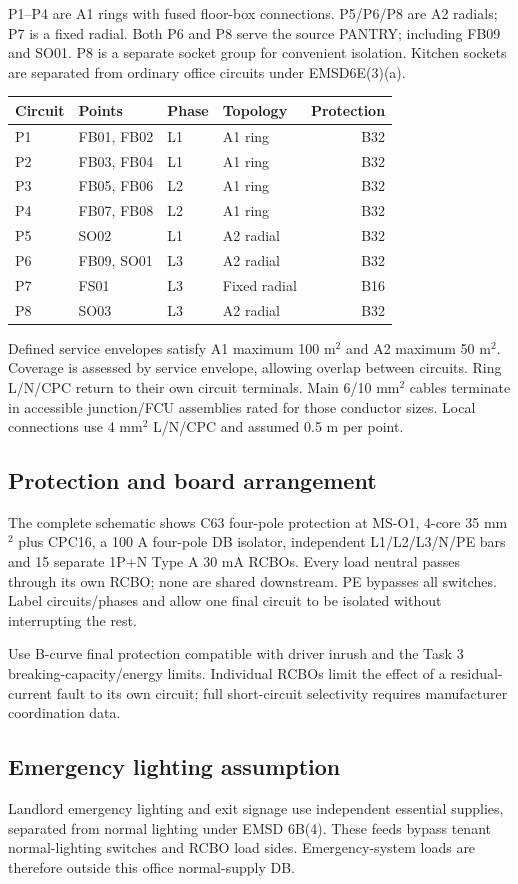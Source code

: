 P1--P4 are A1 rings with fused floor-box connections. P5/P6/P8 are A2 radials;  P7 is a fixed radial. Both P6 and P8 serve the source PANTRY;  including FB09 and SO01. P8 is a separate socket group for convenient isolation. Kitchen sockets are separated from ordinary office circuits under EMSD6E(3)(a).
\begin{center}\begin{tabular}{llllr}\toprule
Circuit & Points & Phase & Topology & Protection\\\midrule

P1 & FB01, FB02 & L1 & A1 ring & B32 \\
P2 & FB03, FB04 & L1 & A1 ring & B32 \\
P3 & FB05, FB06 & L2 & A1 ring & B32 \\
P4 & FB07, FB08 & L2 & A1 ring & B32 \\
P5 & SO02 & L1 & A2 radial & B32 \\
P6 & FB09, SO01 & L3 & A2 radial & B32 \\
P7 & FS01 & L3 & Fixed radial & B16 \\
P8 & SO03 & L3 & A2 radial & B32 \\

\bottomrule\end{tabular}\end{center}
Defined service envelopes satisfy A1 maximum 100 m$^2$ and A2 maximum 50 m$^2$. Coverage is assessed by service envelope, allowing overlap between circuits. Ring L/N/CPC return to their own circuit terminals. Main 6/10 mm$^2$ cables terminate in accessible junction/FCU assemblies rated for those conductor sizes. Local connections use 4 mm$^2$ L/N/CPC and assumed 0.5 m per point.
\clearpage

\subsection*{Protection and board arrangement}
The complete schematic shows C63 four-pole protection at MS-O1, 4-core 35 mm$^2$ plus CPC16, a 100 A four-pole DB isolator, independent L1/L2/L3/N/PE bars and 15 separate 1P+N Type A 30 mA RCBOs. Every load neutral passes through its own RCBO;  none are shared downstream. PE bypasses all switches. Label circuits/phases and allow one final circuit to be isolated without interrupting the rest.

Use B-curve final protection compatible with driver inrush and the Task 3 breaking-capacity/energy limits. Individual RCBOs limit the effect of a residual-current fault to its own circuit; full short-circuit selectivity requires manufacturer coordination data.
\subsection*{Emergency lighting assumption}
Landlord emergency lighting and exit signage use independent essential supplies, separated from normal lighting under EMSD 6B(4). These feeds bypass tenant normal-lighting switches and RCBO load sides. Emergency-system loads are therefore outside this office normal-supply DB.
